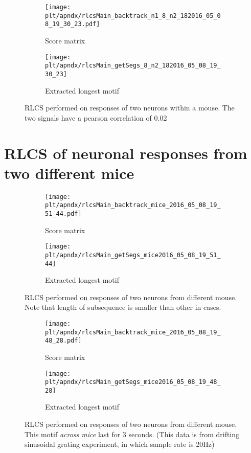 \documentclass[MTech]{iitmdiss}
\newcommand{\plt}{thesis_plots}
\begin{document}
\begin{figure}[h]
  \begin{subfigure}[b]{0.5\textwidth}
    \texttt{[image: \\plt/apndx/rlcsMain\_backtrack\_n1\_8\_n2\_182016\_05\_08\_19\_30\_23.pdf]}
    \caption{Score matrix}
  \end{subfigure}%
  \begin{subfigure}[b]{0.5\textwidth}
    \texttt{[image: \\plt/apndx/rlcsMain\_getSegs\_8\_n2\_182016\_05\_08\_19\_30\_23]}
    \caption{Extracted longest motif}
  \end{subfigure}%
  \caption{RLCS performed on responses of two neurons within a mouse. The two signals have a pearson correlation of 0.02}
  \label{fig:}
\end{figure}
\FloatBarrier
\section{RLCS of neuronal responses from two different mice} %
\label{sec:rlcs_of_neuronal_responses_from_two_different_mice}
\begin{figure}[h]
  \begin{subfigure}[b]{0.5\textwidth}
    \texttt{[image: \\plt/apndx/rlcsMain\_backtrack\_mice\_2016\_05\_08\_19\_51\_44.pdf]}
    \caption{Score matrix}
  \end{subfigure}%
  \begin{subfigure}[b]{0.5\textwidth}
    \texttt{[image: \\plt/apndx/rlcsMain\_getSegs\_mice2016\_05\_08\_19\_51\_44]}
    \caption{Extracted longest motif}
  \end{subfigure}%
  \caption{RLCS performed on responses of two neurons from different mouse. Note that length of subsequence is smaller than other in cases.}
  \label{fig:}
\end{figure}

\begin{figure}[h]
  \begin{subfigure}[b]{0.5\textwidth}
    \texttt{[image: \\plt/apndx/rlcsMain\_backtrack\_mice\_2016\_05\_08\_19\_48\_28.pdf]}
    \caption{Score matrix}
  \end{subfigure}%
  \begin{subfigure}[b]{0.5\textwidth}
    \texttt{[image: \\plt/apndx/rlcsMain\_getSegs\_mice2016\_05\_08\_19\_48\_28]}
    \caption{Extracted longest motif}
  \end{subfigure}%
  \caption{RLCS performed on responses of two neurons from different mouse. This motif \textit{across mice} last for 3 seconds. (This data is from drifting sinusoidal grating experiment, in which sample rate is 20Hz)}
  \label{fig:}
\end{figure}
\end{document}
